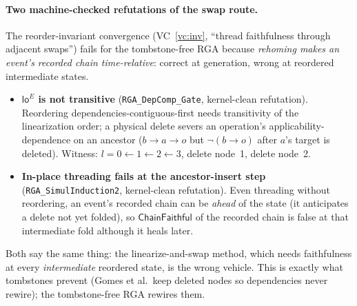 \documentclass[11pt]{article}
\newcommand{\loE}[1]{\mathsf{lo}^{#1}}
\newcommand{\lean}[1]{\texttt{#1}}
\newcommand{\ChainFaithful}{\textsf{ChainFaithful}}
\begin{document}
\paragraph{Two machine-checked refutations of the swap route.} The reorder-invariant convergence
(VC~\ref{vc:inv}, ``thread faithfulness through adjacent swaps'') fails for the tombstone-free
RGA because \emph{rehoming makes an event's recorded chain time-relative}: correct at generation,
wrong at reordered intermediate states.
\begin{itemize}[nosep]
  \item \textbf{$\loE{E}$ is not transitive} (\lean{RGA\_DepComp\_Gate}, kernel-clean refutation).
  Reordering dependencies-contiguous-first needs transitivity of the linearization order; a
  physical delete severs an operation's applicability-dependence on an ancestor
  ($b\!\to\!a\!\to\!o$ but $\neg(b\!\to\!o)$ after $a$'s target is deleted). Witness:
  $l=0\!\leftarrow\!1\!\leftarrow\!2\!\leftarrow\!3$, delete node~1, delete node~2.
  \item \textbf{In-place threading fails at the ancestor-insert step}
  (\lean{RGA\_SimulInduction2}, kernel-clean refutation). Even threading without reordering, an
  event's recorded chain can be \emph{ahead} of the state (it anticipates a delete not yet folded),
  so $\ChainFaithful$ of the recorded chain is false at that intermediate fold although it heals
  later.
\end{itemize}
Both say the same thing: the linearize-and-swap method, which needs faithfulness at every
\emph{intermediate} reordered state, is the wrong vehicle. This is exactly what tombstones prevent
(Gomes et al.\ keep deleted nodes so dependencies never rewire); the tombstone-free RGA rewires
them.
\end{document}
